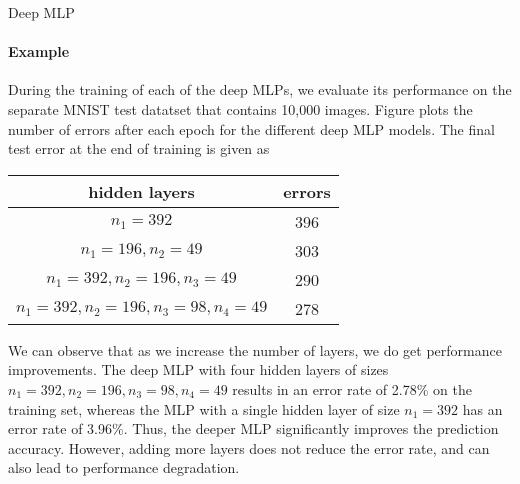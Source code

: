 \begin{frame}{Deep MLP}
\framesubtitle{Example}

    During the training of each of the deep MLPs, we evaluate its
    performance on the separate MNIST test datatset that contains 10,000
    images.
Figure plots the number of errors
    after each epoch for the different deep MLP models.
    The final test error at the end of training
    is given as
    \begin{center}
        \begin{tabular}{|c||c|}
            \hline
            hidden layers & errors\\
            \hline
            $n_1=392$ & 396\\
            $n_1=196,n_2=49$ & 303\\
            $n_1=392,n_2=196,n_3=49$ & 290\\
            $n_1=392,n_2=196,n_3=98,n_4=49$ & 278\\
            \hline
        \end{tabular}
    \end{center}
    We can observe that as we increase the number of layers, we do get
    performance improvements. The deep MLP with four hidden layers of
    sizes $n_1=392,n_2=196,n_3=98,n_4=49$ results in an error rate of
    2.78\% on the training set, whereas the MLP with a single hidden
    layer of size $n_1=392$ has an error rate of 3.96\%.
    Thus, the deeper MLP significantly improves the prediction accuracy.
    However, adding more layers does not reduce the error rate, and can
    also lead to performance degradation.
\end{frame}
%
%

